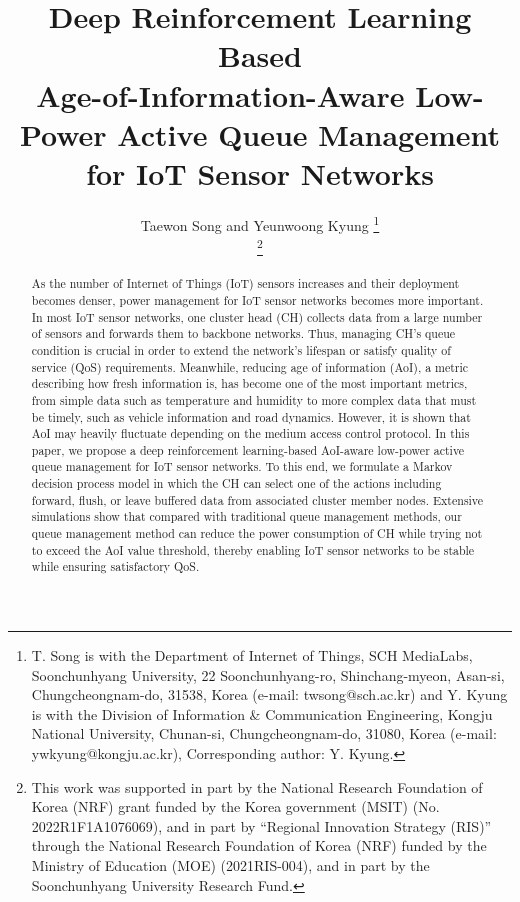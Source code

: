 \documentclass[journal]{IEEEtran}
\begin{document}
\title{Deep Reinforcement Learning Based \\ Age-of-Information-Aware Low-Power Active Queue Management for IoT Sensor Networks}

\author{Taewon Song and Yeunwoong Kyung
\thanks{T. Song is with the Department of Internet of Things, SCH \mbox{MediaLabs}, Soonchunhyang University, 22 Soonchunhyang-ro, Shinchang-myeon, Asan-si, Chungcheongnam-do, 31538, Korea (e-mail: twsong@sch.ac.kr) and Y. Kyung is with the Division of Information \& Communication Engineering, Kongju National University, Chunan-si, Chungcheongnam-do, 31080, Korea (e-mail: ywkyung@kongju.ac.kr), Corresponding author: Y. Kyung.}%

\thanks{This work was supported in part by the National Research Foundation of Korea (NRF) grant funded by the Korea government (MSIT) (No. 2022R1F1A1076069), and in part by ``Regional Innovation Strategy (RIS)'' through the National Research Foundation of Korea (NRF) funded by the Ministry of Education (MOE) (2021RIS-004), and in part by the Soonchunhyang University Research Fund.}
}

{}

\maketitle


\begin{abstract}
As the number of Internet of Things (IoT) sensors increases and their deployment becomes denser, power management for IoT sensor networks becomes more important. In most IoT sensor networks, one cluster head (CH) collects data from a large number of sensors and forwards them to backbone networks. Thus, managing CH's queue condition is crucial in order to extend the network's lifespan or satisfy quality of service (QoS) requirements. 
Meanwhile, reducing age of information (AoI), a metric describing how fresh information is, has become one of the most important metrics, from simple data such as temperature and humidity to more complex data that must be timely, such as vehicle information and road dynamics. However, it is shown that AoI may heavily fluctuate depending on the medium access control protocol. In this paper, we propose a deep reinforcement learning-based AoI-aware low-power active queue management for IoT sensor networks. To this end, we formulate a Markov decision process model in which the CH can select one of the actions including forward, flush, or leave buffered data from associated cluster member nodes.
Extensive simulations show that compared with traditional queue management methods, our queue management method can reduce the power consumption of CH while trying not to exceed the AoI value threshold, thereby enabling IoT sensor networks to be stable while ensuring satisfactory QoS.
\end{abstract}
\end{document}
